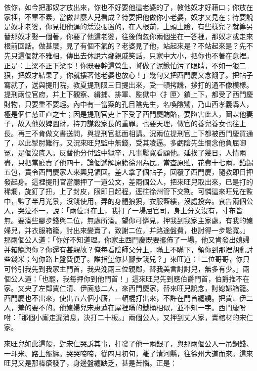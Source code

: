 \begin{showcontents}{}
依你，如今把那奴才放出來，你也不好要他這老婆的了，教他奴才好藉口；你放在家裡，不葷不素，當做甚麼人兒看成？待要把他做你小老婆，奴才又見在；待要說是奴才老婆，你見把他逞的恁沒張置的，在人根前，上頭上臉，有些樣兒？就筭另替那奴才娶一個著，你要了他這老婆，往後倘忽你兩個坐在一答裡，那奴才或走來根前回話。做甚麼，見了有個不氣的？老婆見了他，站起來是？不站起來是？先不先只這個就不雅相，傳出去休說六鄰親戚笑話，只家中大小，把你也不著在意裡。正是：上梁不正下梁歪！你既要幹這營生，誓做了泥鰍怕污了眼睛，不如一狠二狠，把奴才結果了，你就摟著他老婆也放心！」幾句又把西門慶又念翻了。把帖子寫就了，送與提刑院，教夏提刑限三日提出來，受一頓拷譏，拶打的通不像模樣。提刑兩位官府，并上下觀察、緝捕、排軍、監獄中〈扌匣〉鎖上下，都受了西門慶財物，只要重不要輕。內中有一當案的孔目陰先生，名喚陰騭，乃山西孝義縣人，極是個仁慈正直之士；因是提刑官吏上下受了西門慶賄賂，要陷害此人，圖謀他妻子，故入他奴婢圖財，持刀謀殺家長的重罪。也要天理，做官的養兒養女也往上長。再三不肯做文書送問，與提刑官抵面相講。況兩位提刑官上下都被西門慶買通了，以此掣肘難行。又況來旺兒監中無錢，受其凌逼。多虧陰先生憫念他負屈啣冤，是個沒底入。反替他分付監中獄卒，凡事鬆寬看顧他。延挨了幾日，人情兩盡，只把當廳責了他四十，論個遞解原籍徐州為民。當查原賍，花費十七兩，鉛錫五包，責令西門慶家人來興兒領回。差人拿了個帖子，回覆了西門慶，隨教即日押發起身。這裡提刑官當廳押了一道公文，差兩個公人，把來旺兒取出來，已是打的稀爛，旋釘了扭，上了封皮，限即日起程，逕往徐州管下交割。可憐這來旺兒在監中，監了半月光景，沒錢使用，弄的身體狼狽，衣服藍縷，沒處投奔。哀告兩個公人，哭泣不一，說：「兩位哥在上，我打了一場屈官司，身上分文沒有，寸布皆無。要湊些腳步錢與二位，無處所湊。望你可憐見，押我到我家主家處，有我的媳婦兒，并衣服箱籠，討出來變賣了，致謝二位，并路途盤費，也討得一步鬆寬。」那兩個公人道：「你好不知道理。你家主西門慶既要擺佈了一場，他又肯發出媳婦并箱籠與你？你還有甚親故？俺每看陰師父分上，瞞上不瞞下，領你到那裡胡亂討些錢米；勾你路上盤費便了。誰指望你甚腳步錢兒？」來旺道：「二位哥哥，你只可忴引我先到我家主門首，我央浼兩三位親鄰，替我美言討討兒，無多有少。」兩個公人道：「也罷，我每押你到他門首！」這來旺兒先到應伯爵門首，伯爵推不在家。又央了左鄰賈仁清、伊面慈二人，來西門慶家，替來旺兒說念，討媳婦箱籠。西門慶也不出來，使出五六個小廝，一頓棍打出來，不許在門首纏繞。把賈、伊二人，羞的要不的。他媳婦兒宋惠蓮在屋裡瞞的鐵桶相似，並不知一字。西門慶吩咐：「那個小廝走漏消息，決打二十板。」兩個公人，又押到丈人家，賣棺材的宋仁家。

來旺兒如此這般，對宋仁哭訴其事，打發了他一兩銀子，與那兩個公人一吊銅錢、一斗米、路上盤纏。哭哭啼啼，從四月初旬，離了清河縣，往徐州大道而來。這來旺兒又是那棒瘡發了，身邊盤纏缺乏，甚是苦惱。正是：


\end{showcontents}
